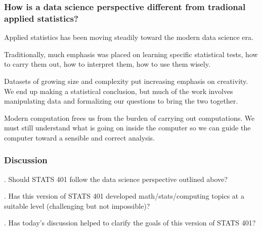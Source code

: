 \documentclass{beamer}
\begin{document}

\begin{frame}
\frametitle{How is a data science perspective different from tradional applied statistics?}

\begin{myitemize}
\item Applied statistics has been moving steadily toward the modern data science era.

\item Traditionally, much emphasis was placed on learning specific statistical tests, how to carry them out, how to interpret them, how to use them wisely.

\item Datasets of growing size and complexity put increasing emphasis on creativity. We end up making a statistical conclusion, but much of the work involves manipulating data and formalizing our questions to bring the two together.

\item Modern computation frees us from the burden of carrying out computations. We must still understand what is going on inside the computer so we can guide the computer toward a sensible and correct analysis.

\end{myitemize}

\end{frame}

\begin{frame}
  \frametitle{Discussion}
  . Should STATS 401 follow the data science perspective outlined above?

  \vspace{15mm}

   . Has this version of STATS 401 developed math/stats/computing topics at a suitable level (challenging but not impossible)?

  \vspace{15mm}
  
   . Has today's discussion helped to clarify the goals of this version of STATS 401?

  \vspace{15mm}

\end{frame}
\end{document}
